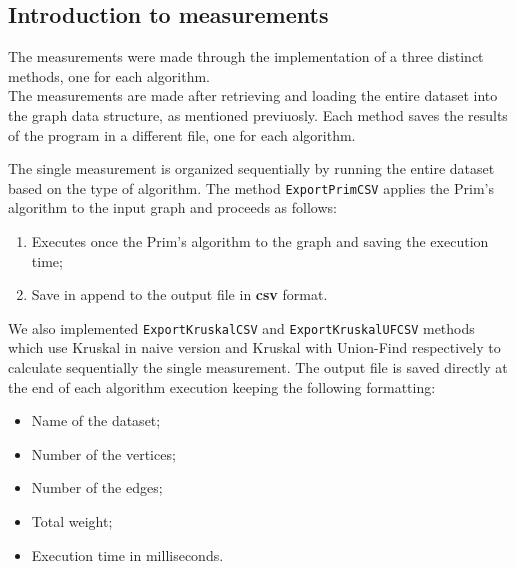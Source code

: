 \subsection{Introduction to measurements}
The measurements were made through the implementation of a three distinct methods, one for each algorithm. \\ \noindent
The measurements are made after retrieving and loading the entire dataset into the graph data structure, as mentioned previuosly. Each method saves the results of the program in a different file, one for each algorithm.

The single measurement is organized sequentially by running the entire dataset based on the type of algorithm. The method \verb|ExportPrimCSV| applies the Prim's algorithm to the input graph and proceeds as follows:
\begin{enumerate}
    \item Executes once the Prim's algorithm to the graph and saving the execution time;
    \item Save in append to the output file in \textbf{csv} format. 
\end{enumerate}
We also implemented \verb|ExportKruskalCSV| and \verb|ExportKruskalUFCSV| methods which use Kruskal in naive version and Kruskal with Union-Find respectively to calculate sequentially the single measurement.
\noindent
The output file is saved directly at the end of each algorithm execution keeping the following formatting:
\begin{itemize}
    \item Name of the dataset;
    \item Number of the vertices;
    \item Number of the edges;
    \item Total weight;
    \item Execution time in milliseconds.
\end{itemize}